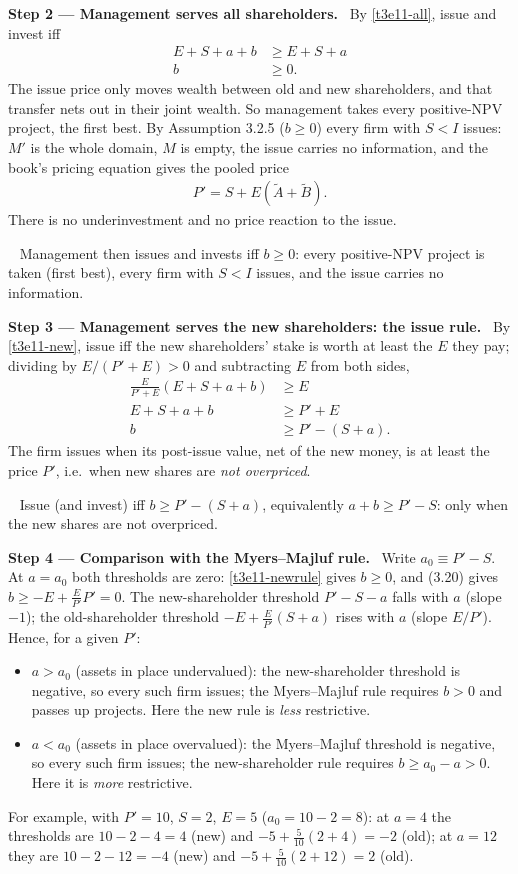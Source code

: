 \documentclass[11pt,a4paper]{article}
\newcommand{\step}[2]{\par\medskip\noindent\textbf{Step #1 --- #2.}~}
\newcommand{\answer}[1]{\par\smallskip\noindent\fbox{\textbf{Answer #1.}}~}
\begin{document}
\step{2}{Management serves all shareholders} By \eqref{t3e11-all}, issue and invest iff
\begin{align}
  E+S+a+b &\ge E+S+a \nonumber\\
  b &\ge 0. \label{t3e11-allrule}
\end{align}
The issue price only moves wealth between old and new shareholders, and that transfer nets out in their
joint wealth. So management takes every positive-NPV project, the first best. By Assumption 3.2.5
($b\ge0$) every firm with $S<I$ issues: $M'$ is the whole domain, $M$ is empty, the issue carries no
information, and the book's pricing equation gives the pooled price
\begin{align}
  P' = S+E(\widetilde A+\widetilde B). \label{t3e11-Pall}
\end{align}
There is no underinvestment and no price reaction to the issue.

\answer{(a)} Management then issues and invests iff $b\ge0$: every positive-NPV project is taken (first best), every firm with $S<I$ issues, and the issue carries no information.

\step{3}{Management serves the new shareholders: the issue rule} By \eqref{t3e11-new}, issue iff the new shareholders' stake is worth at least the $E$ they pay; dividing by $E/(P'+E)>0$ and subtracting $E$ from both sides,
\begin{align}
  \frac{E}{P'+E}(E+S+a+b) &\ge E \nonumber\\
  E+S+a+b &\ge P'+E \nonumber\\
  b &\ge P'-(S+a). \label{t3e11-newrule}
\end{align}
The firm issues when its post-issue value, net of the new money, is at least the price $P'$, i.e.\ when
new shares are \emph{not overpriced}.

\answer{(b)} Issue (and invest) iff $b\ge P'-(S+a)$, equivalently $a+b\ge P'-S$: only when the new shares are not overpriced.

\step{4}{Comparison with the Myers--Majluf rule} Write $a_0\equiv P'-S$. At $a=a_0$ both thresholds are
zero: \eqref{t3e11-newrule} gives $b\ge0$, and (3.20) gives $b\ge-E+\frac{E}{P'}P'=0$. The new-shareholder
threshold $P'-S-a$ falls with $a$ (slope $-1$); the old-shareholder threshold
$-E+\frac{E}{P'}(S+a)$ rises with $a$ (slope $E/P'$). Hence, for a given $P'$:
\begin{itemize}
  \item $a>a_0$ (assets in place undervalued): the new-shareholder threshold is negative, so every such firm
        issues; the Myers--Majluf rule requires $b>0$ and passes up projects. Here the new rule is \emph{less} restrictive.
  \item $a<a_0$ (assets in place overvalued): the Myers--Majluf threshold is negative, so every such firm
        issues; the new-shareholder rule requires $b\ge a_0-a>0$. Here it is \emph{more} restrictive.
\end{itemize}
For example, with $P'=10$, $S=2$, $E=5$ ($a_0=10-2=8$): at $a=4$ the thresholds are $10-2-4=4$ (new) and $-5+\frac{5}{10}(2+4)=-2$ (old); at
$a=12$ they are $10-2-12=-4$ (new) and $-5+\frac{5}{10}(2+12)=2$ (old).
\end{document}

